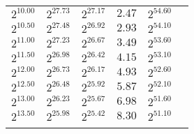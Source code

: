 \begin{tabular}{llllll}
$2^{10.00}$ & $2^{27.73}$ & $2^{27.17}$ & $2.47$ & $2^{54.60}$ \\
$2^{10.50}$ & $2^{27.48}$ & $2^{26.92}$ & $2.93$ & $2^{54.10}$ \\
$2^{11.00}$ & $2^{27.23}$ & $2^{26.67}$ & $3.49$ & $2^{53.60}$ \\
$2^{11.50}$ & $2^{26.98}$ & $2^{26.42}$ & $4.15$ & $2^{53.10}$ \\
$2^{12.00}$ & $2^{26.73}$ & $2^{26.17}$ & $4.93$ & $2^{52.60}$ \\
$2^{12.50}$ & $2^{26.48}$ & $2^{25.92}$ & $5.87$ & $2^{52.10}$ \\
$2^{13.00}$ & $2^{26.23}$ & $2^{25.67}$ & $6.98$ & $2^{51.60}$ \\
$2^{13.50}$ & $2^{25.98}$ & $2^{25.42}$ & $8.30$ & $2^{51.10}$ \\
 &  &  &  &  &  \\
\end{tabular}